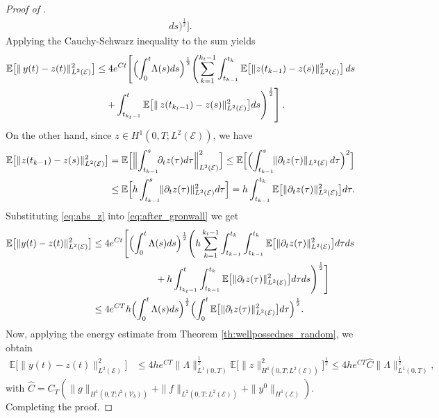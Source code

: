 \documentclass[a4paper, 10pt, english]{article}
\begin{document}
\begin{proof}[Proof of  ]
\begin{align*}
      ds\Bigr)^{\frac{1}{2}}
\Biggr].
\end{align*}
Applying the Cauchy-Schwarz inequality to the sum yields
\begin{align}\label{eq:after_gronwall}
\nonumber
\mathbb{E}\bigl[\|\,y(t) - z(t)\|_{L^2(\mathcal{E})}^2\bigr]
&\le
4e^{Ct}
\Biggl[
  \Bigl(\int_{0}^{t}\!\Lambda(s)ds\Bigr)^{\frac{1}{2}}
  \Biggl(
    \sum_{k=1}^{k_t - 1}
      \int_{t_{k-1}}^{t_{k}}
         \mathbb{E}\bigl[\|z(t_{k-1}) - z(s)\|_{L^2(\mathcal{E})}^2\bigr]\,
      ds
\\
&\quad
\left.
    +
    \int_{t_{k_t - 1}}^{t}
      \mathbb{E}\bigl[\|\,z(t_{k_t - 1}) - z(s)\|_{L^2(\mathcal{E})}^2\bigr]
    ds
  \Biggr)^{\frac{1}{2}}
\right].
\end{align}
On the other hand, since $z \in H^1(0,T; L^2(\mathcal{E}))$, we have
\begin{align}\label{eq:abs_z}
\nonumber\mathbb{E}\bigl[\|z(t_{k-1}) - z(s)\|_{L^2(\mathcal{E})}^2\bigr]
&=
\mathbb{E}\Bigl[\Bigl\|\int_{t_{k-1}}^s \! \! \partial_t z(\tau)d\tau\Bigr\|_{L^2(\mathcal{E})}^2\Bigr]\le
\mathbb{E}\Bigl[\Bigl(\int_{t_{k-1}}^s \! \!\|\partial_t z(\tau)\|_{L^2(\mathcal{E})}\,d\tau\Bigr)^2\Bigr]\\
&\le
\mathbb{E}\Bigl[h\int_{t_{k-1}}^s  \! \!\|\partial_t z(\tau)\|_{L^2(\mathcal{E})}^2d\tau \Bigr]=
h\int_{t_{k-1}}^{t_k}
\mathbb{E}\bigl[\|\partial_t z(\tau)\|_{L^2(\mathcal{E})}^2\bigr]d\tau.
\end{align}
Substituting \eqref{eq:abs_z} into \eqref{eq:after_gronwall} we get
\begin{align*}
\mathbb{E}\bigl[\|y(t) - z(t)\|_{L^2(\mathcal{E})}^2\bigr]&\leq4e^{Ct}\Biggl[\Bigl(\int_{0}^{t} \Lambda(s)ds\Bigr)^{\frac{1}{2}}
\Biggl(h \sum_{k=1}^{k_t - 1}\int_{t_{k-1}}^{t_k}\int_{t_{k-1}}^{t_k}\mathbb{E}\bigl[\|\partial_t z(\tau)\|_{L^2(\mathcal{E})}^2\bigr]d\tau ds\\
&\hspace{2cm}\quad+h\int_{t_{k_t - 1}}^{t}\int_{t_{k-1}}^{t_k}
\mathbb{E}\bigl[\|\partial_t z(\tau)\|_{L^2(\mathcal{E})}^2\bigr]
d\tau ds\Biggr)^{\frac{1}{2}}\Biggr]\\
&\le 4e^{CT}h\Bigl(\int_{0}^{t}\Lambda(s)ds\Bigr)^{\frac{1}{2}}
\Bigl(\int_{0}^{t}\mathbb{E}\bigl[\|\partial_t z(\tau)\|_{L^2(\mathcal{E})}^2\bigr]d\tau\Bigr)^{\frac{1}{2}}. 
\end{align*}
Now, applying the energy estimate from Theorem \ref{th:wellpossednes_random}, we obtain 
\begin{align*}
\mathbb{E}\bigl[\|y(t) - z(t)\|_{L^2(\mathcal{E})}^2\bigr]  &\le4he^{CT}\|\Lambda\|_{L^1(0,T)}^{\frac{1}{2}}\mathbb{E}\bigl[\|z\|_{H^1(0,T;L^2(\mathcal{E}))}^2\bigr]^{\frac{1}{2}}\leq4he^{CT}\hat{C}\|\Lambda\|_{L^1(0,T)}^{\frac{1}{2}},
\end{align*}
with $\hat{C} = C_T(\|g\|_{H^1(0,T;l^2(\mathcal{V}_b))} + \|f\|_{L^2(0,T;L^2(\mathcal{E}))} + \|y^0\|_{H^1(\mathcal{E})}).$ Completing the proof.
\end{proof}
\end{document}
